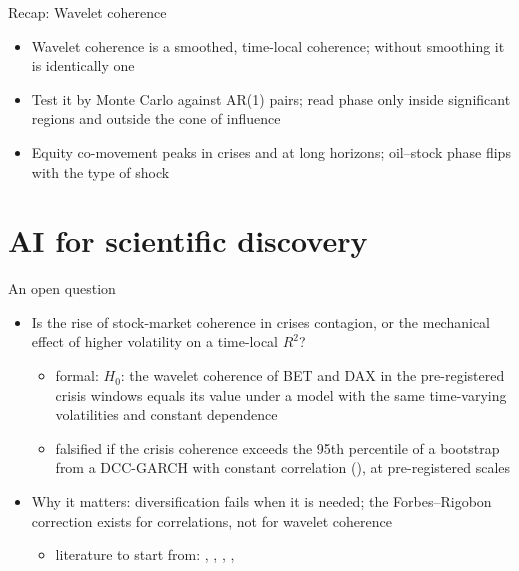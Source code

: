 \begin{frame}{Recap: Wavelet coherence}
\itemsize{\small}
\begin{itemize}
    \item Wavelet coherence is a smoothed, time-local coherence; without smoothing it is identically one
    \item Test it by Monte Carlo against AR(1) pairs; read phase only inside significant regions and outside the cone of influence
    \item Equity co-movement peaks in crises and at long horizons; oil--stock phase flips with the type of shock
\end{itemize}
\end{frame}


\section{AI for scientific discovery}

\begin{frame}{An open question}
\itemsize{\small}
\begin{itemize}
    \item Is the rise of stock-market coherence in crises contagion, or the mechanical effect of higher volatility on a time-local $R^2$?
    \begin{itemize}
        \item formal: $H_0$: the wavelet coherence of BET and DAX in the pre-registered crisis windows equals its value under a model with the same time-varying volatilities and constant dependence
        \item falsified if the crisis coherence exceeds the 95th percentile of a bootstrap from a DCC-GARCH with constant correlation (), at pre-registered scales
    \end{itemize}
    \item Why it matters: diversification fails when it is needed; the Forbes--Rigobon correction exists for correlations, not for wavelet coherence
    \begin{itemize}
        \item literature to start from: , , , , 
    \end{itemize}
\end{itemize}
\end{frame}

